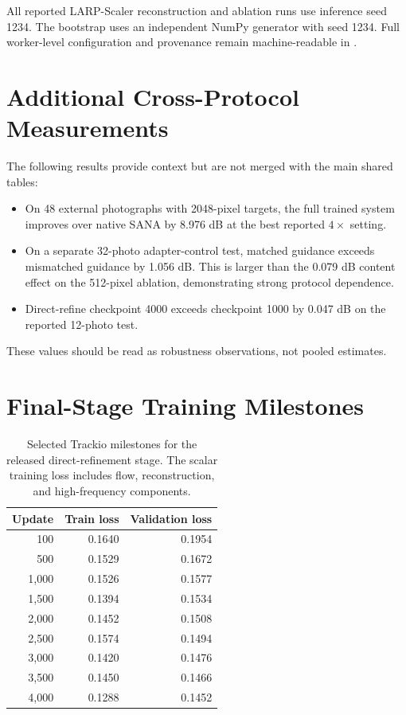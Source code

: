 \documentclass[10pt]{article}
\newcommand{\method}{LARP-Scaler\xspace}
\begin{document}
All reported \method reconstruction and ablation runs use inference seed 1234.
The bootstrap uses an independent NumPy generator with seed 1234. Full
worker-level configuration and provenance remain machine-readable in
.


\section{Additional Cross-Protocol Measurements}
\label{app:extra}

The following results provide context but are not merged with the main shared
tables:
\begin{itemize}
  \item On 48 external photographs with 2048-pixel targets, the full trained
  system improves over native SANA by 8.976 dB at the best reported $4\times$
  setting.
  \item On a separate 32-photo adapter-control test, matched guidance exceeds
  mismatched guidance by 1.056 dB. This is larger than the 0.079 dB content
  effect on the 512-pixel ablation, demonstrating strong protocol dependence.
  \item Direct-refine checkpoint 4000 exceeds checkpoint 1000 by 0.047 dB on
  the reported 12-photo test.
\end{itemize}
These values should be read as robustness observations, not pooled estimates.

\section{Final-Stage Training Milestones}
\label{app:training}

\begin{table}[H]
  \centering
  \caption{Selected Trackio milestones for the released direct-refinement
  stage. The scalar training loss includes flow, reconstruction, and
  high-frequency components.}
  \label{tab:training_milestones}
  \small
  \begin{tabular}{rrr}
    \toprule
    Update & Train loss & Validation loss\\
    \midrule
    100  & 0.1640 & 0.1954\\
    500  & 0.1529 & 0.1672\\
    1,000 & 0.1526 & 0.1577\\
    1,500 & 0.1394 & 0.1534\\
    2,000 & 0.1452 & 0.1508\\
    2,500 & 0.1574 & 0.1494\\
    3,000 & 0.1420 & 0.1476\\
    3,500 & 0.1450 & 0.1466\\
    4,000 & 0.1288 & 0.1452\\
    \bottomrule
  \end{tabular}
\end{table}
\iffalse
\end{document}
